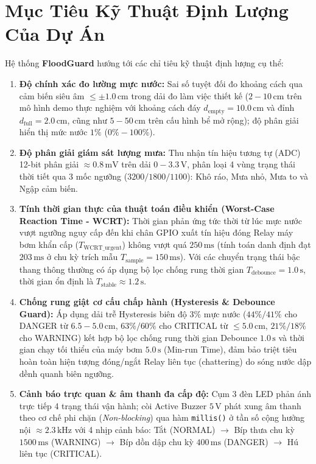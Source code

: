 \section{Mục Tiêu Kỹ Thuật Định Lượng Của Dự Án}
\label{sec:quantitative_goals}
Hệ thống \textbf{FloodGuard} hướng tới các chỉ tiêu kỹ thuật định lượng cụ thể:
\begin{enumerate}
    \item \textbf{Độ chính xác đo lường mực nước:} Sai số tuyệt đối đo khoảng cách qua cảm biến siêu âm $\le \pm 1.0\,\text{cm}$ trong dải đo làm việc thiết kế ($2 - 10\,\text{cm}$ trên mô hình demo thực nghiệm với khoảng cách đáy $d_{\text{empty}} = 10.0\,\text{cm}$ và đỉnh $d_{\text{full}} = 2.0\,\text{cm}$, cũng như $5 - 50\,\text{cm}$ trên cấu hình bể mở rộng); độ phân giải hiển thị mức nước $1\%$ ($0\% - 100\%$).
    \item \textbf{Độ phân giải giám sát lượng mưa:} Thu nhận tín hiệu tương tự (ADC) 12-bit phân giải $\approx 0.8\,\text{mV}$ trên dải $0 - 3.3\,\text{V}$, phân loại 4 vùng trạng thái thời tiết qua 3 mốc ngưỡng ($3200 / 1800 / 1100$): Khô ráo, Mưa nhỏ, Mưa to và Ngập cảm biến.
    \item \textbf{Tính thời gian thực của thuật toán điều khiển (Worst-Case Reaction Time - WCRT):} Thời gian phản ứng tức thời từ lúc mực nước vượt ngưỡng nguy cấp đến khi chân GPIO xuất tín hiệu đóng Relay máy bơm khẩn cấp ($T_{\text{WCRT\_urgent}}$) không vượt quá $250\,\text{ms}$ (tính toán danh định đạt $203\,\text{ms}$ ở chu kỳ trích mẫu $T_{\text{sample}} = 150\,\text{ms}$). Với các chuyển trạng thái bậc thang thông thường có áp dụng bộ lọc chống rung thời gian $T_{\text{debounce}} = 1.0\,\text{s}$, thời gian ổn định là $T_{\text{stable}} \approx 1.2\,\text{s}$.
    \item \textbf{Chống rung giật cơ cấu chấp hành (Hysteresis \& Debounce Guard):} Áp dụng dải trễ Hysteresis biên độ $3\%$ mực nước ($44\%/41\%$ cho DANGER từ $6.5 - 5.0\,\text{cm}$, $63\%/60\%$ cho CRITICAL từ $\le 5.0\,\text{cm}$, $21\%/18\%$ cho WARNING) kết hợp bộ lọc chống rung thời gian Debounce $1.0\,\text{s}$ và thời gian chạy tối thiểu của máy bơm $5.0\,\text{s}$ (Min-run Time), đảm bảo triệt tiêu hoàn toàn hiện tượng đóng/ngắt Relay liên tục (chattering) do sóng nước dập dềnh quanh biên ngưỡng.
    \item \textbf{Cảnh báo trực quan \& âm thanh đa cấp độ:} Cụm 3 đèn LED phản ánh trực tiếp 4 trạng thái vận hành; còi Active Buzzer $5\,\text{V}$ phát xung âm thanh theo cơ chế phi chặn (\textit{Non-blocking}) qua hàm \texttt{millis()} ở tần số cộng hưởng nội $\approx 2.3\,\text{kHz}$ với 4 nhịp cảnh báo: Tắt (NORMAL) $\to$ Bíp thưa chu kỳ $1500\,\text{ms}$ (WARNING) $\to$ Bíp dồn dập chu kỳ $400\,\text{ms}$ (DANGER) $\to$ Hú liên tục (CRITICAL).

\end{enumerate}
